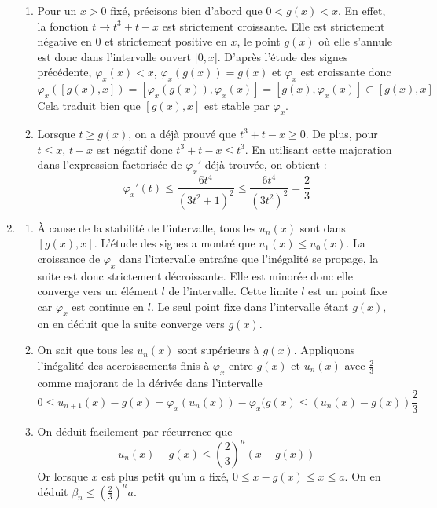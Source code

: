 \begin{enumerate}
\begin{enumerate}
 \item Pour un $x>0$ fixé, précisons bien d'abord que $0<g(x)<x$. En effet, la fonction $t\rightarrow t^3+t-x$ est strictement croissante. Elle est strictement négative en $0$ et strictement positive en $x$, le point $g(x)$ où elle s'annule est donc dans l'intervalle ouvert $]0,x[$.\newline
D'après l'étude des signes précédente, $\varphi_x(x)<x$, $\varphi_x(g(x))=g(x)$ et $\varphi_x$ est croissante donc 
\begin{displaymath}
\varphi_x([g(x),x])=[\varphi_x(g(x)),\varphi_x(x)]=[g(x),\varphi_x(x)]\subset[g(x),x] 
\end{displaymath}
Cela traduit bien que $[g(x),x]$ est stable par $\varphi_x$.

 \item Lorsque $t\geq g(x)$, on a déjà prouvé que $t^3+t-x\geq 0$. De plus, pour $t\leq x$, $t-x$ est négatif donc $t^3+t-x\leq t^3$. En utilisant cette majoration dans l'expression factorisée de $\varphi_x'$ déjà trouvée, on obtient :
\begin{displaymath}
 \varphi_x'(t)\leq\frac{6t^4}{(3t^2+1)^2}\leq\frac{6t^4}{(3t^2)^2}=\frac{2}{3}
\end{displaymath}
\end{enumerate}

 \item 
\begin{enumerate}
 \item \`A cause de la stabilité de l'intervalle, tous les $u_n(x)$ sont dans $[g(x),x]$. L'étude des signes a montré que $u_1(x)\leq u_0(x)$. La croissance de $\varphi_x$ dans l'intervalle entraîne que l'inégalité se propage, la suite est donc strictement décroissante. Elle est minorée donc elle converge vers un élément $l$ de l'intervalle. Cette limite $l$ est un point fixe car $\varphi_x$ est continue en $l$. Le seul point fixe dans l'intervalle étant $g(x)$, on en déduit que la suite converge vers $g(x)$. 
 
 \item On sait que tous les $u_n(x)$ sont supérieurs à $g(x)$. Appliquons l'inégalité des accroissements finis à $\varphi_x$ entre $g(x)$ et $u_n(x)$ avec $\frac{2}{3}$ comme majorant de la dérivée dans l'intervalle
\begin{displaymath}
 0\leq u_{n+1}(x)-g(x)=\varphi_x(u_n(x))-\varphi_x(g(x)
\leq (u_n(x)-g(x))\frac{2}{3}
\end{displaymath}

 \item On déduit facilement par récurrence que 
\begin{displaymath}
 u_n(x)-g(x)\leq \left(\frac{2}{3} \right)^n(x-g(x))
\end{displaymath}
 Or lorsque $x$ est plus petit qu'un $a$ fixé, $0\leq x-g(x)\leq x\leq a$. On en déduit $\beta_n\leq\left(\frac{2}{3} \right)^n a$.
 

\end{enumerate}
\end{enumerate}
